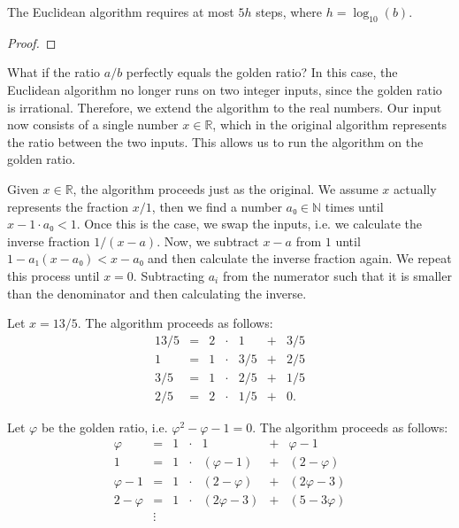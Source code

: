 \begin{proposition}
  The Euclidean algorithm requires at most $5h$ steps,
  where $h = \log_{10}(b)$.
\end{proposition}

\begin{proof}
\end{proof}

What if the ratio $a/b$ perfectly equals the golden ratio?
In this case, the Euclidean algorithm no longer runs on two integer inputs,
since the golden ratio is irrational.
Therefore, we extend the algorithm to the real numbers.
Our input now consists of a single number $x ∈ ℝ$, which in the original
algorithm represents the ratio between the two inputs.
This allows us to run the algorithm on the golden ratio.

Given $x ∈ ℝ$, the algorithm proceeds just as the original.
We assume $x$ actually represents the fraction $x/1$,
then we find a number $a₀ ∈ ℕ$ times until $x - 1 · a₀ < 1$.
Once this is the case, we swap the inputs, i.e. we calculate the inverse fraction $1/(x - a)$.
Now, we subtract $x - a$ from $1$ until $1 - a₁ (x - a₀) < x - a₀$
and then calculate the inverse fraction again.
We repeat this process until $x = 0$.
Subtracting $a_i$ from the numerator such that it is smaller than the
denominator and then calculating the inverse.

\begin{example}
  Let $x = 13/5$.
  The algorithm proceeds as follows:
  \[
    \begin{array}{rclcrcl}
      13/5 & = & 2 & · & 1   & + & 3/5 \\
         1 & = & 1 & · & 3/5 & + & 2/5 \\
       3/5 & = & 1 & · & 2/5 & + & 1/5 \\
       2/5 & = & 2 & · & 1/5 & + & 0.
    \end{array}
  \]
\end{example}

\begin{example}
  Let $φ$ be the golden ratio,
  i.e. $φ^2 - φ - 1 = 0$.
  The algorithm proceeds as follows:
  \[
    \begin{array}{rclcrcl}
      φ & = & 1 & · & 1   & + & φ - 1 \\
         1 & = & 1 & · & (φ - 1) & + & (2 - φ) \\
       φ - 1 & = & 1 & · & (2 - φ) & + & (2φ - 3) \\
       2 - φ & = & 1 & · & (2φ - 3) & + & (5 - 3φ) \\
       & \vdots &
    \end{array}
  \]
\end{example}


